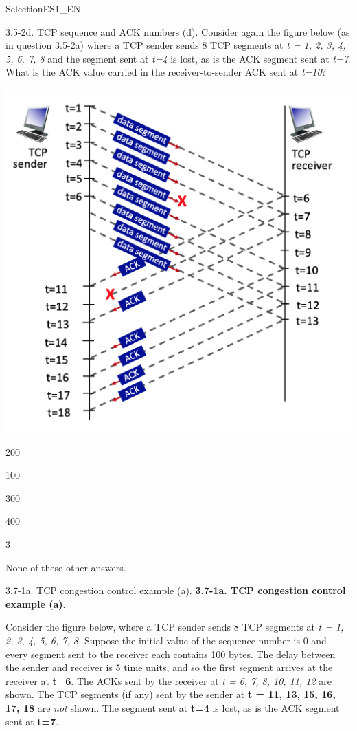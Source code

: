 \documentclass[a4paper]{article}
\begin{document}
\begin{quiz}{SelectionES1\_EN}
\begin{multi}[points=1,shuffle]{3.5-2d. TCP sequence and ACK numbers (d).}
Consider again the figure below (as in question 3.5-2a) where a TCP sender sends 8 TCP segments at \emph{t = 1, 2, 3, 4, 5, 6, 7, 8} and the segment sent at \emph{t=4} is lost, as is the ACK segment sent at \emph{t=7}. What is the ACK value carried in the receiver-to-sender ACK sent at \emph{t=10}?
\begin{center}
	\includegraphics[width=\linewidth]{figs/tcp_seq_ack_1.jpg}
\end{center}
\item 200
\item 100
\item* 300
\item 400
\item 3
\item None of these other answers.
\end{multi}

\begin{multi}[points=1,shuffle]{3.7-1a. TCP congestion control example (a).}
\textbf{3.7-1a. TCP congestion control example (a).}

Consider the figure below, where a TCP sender sends 8 TCP segments at \emph{t = 1, 2, 3, 4, 5, 6, 7, 8.} Suppose the initial value of the sequence number is 0 and every segment sent to the receiver each contains 100 bytes. The delay between the sender and receiver is 5 time units, and so the first segment arrives at the receiver at \textbf{t=6}. The ACKs sent by the receiver at \emph{t = 6, 7, 8, 10, 11, 12} are shown. The TCP segments (if any) sent by the sender at \textbf{t = 11, 13, 15, 16, 17, 18} are \emph{not} shown. The segment sent at \textbf{t=4} is lost, as is the ACK segment sent at \textbf{t=7}. 


\end{multi}
\end{quiz}
\end{document}
